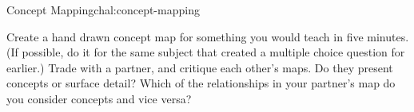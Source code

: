 \begin{challenge}{Concept Mapping}{chal:concept-mapping}

Create a hand drawn concept map for something you would teach in five
minutes.  (If possible, do it for the same subject that created a
multiple choice question for earlier.) Trade with a partner, and
critique each other's maps. Do they present concepts or surface
detail? Which of the relationships in your partner's map do you
consider concepts and vice versa?

\end{challenge}

